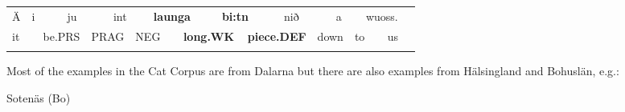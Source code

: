 \begin{tabular}{llllllllllllllllll}
\lsptoprule
Ä & \multicolumn{2}{l}{i

} & \multicolumn{2}{l}{ju

} & \multicolumn{2}{l}{int

} & \multicolumn{2}{l}{{\bfseries launga}

} & \multicolumn{2}{l}{{\bfseries bi:tn}

} & \multicolumn{2}{l}{nið

} & \multicolumn{2}{l}{a

} & \multicolumn{2}{l}{wuoss.

} & \\
\multicolumn{2}{l}{it

} & \multicolumn{2}{l}{be.PRS

} & \multicolumn{2}{l}{PRAG

} & \multicolumn{2}{l}{NEG

} & \multicolumn{2}{l}{{\bfseries long.WK}

} & \multicolumn{2}{l}{{\bfseries piece.DEF}

} & \multicolumn{2}{l}{down

} & \multicolumn{2}{l}{to

} & \multicolumn{2}{l}{us

}\\
\lspbottomrule
\end{tabular}

Most of the examples in the Cat Corpus are from Dalarna but there are also examples from Hälsingland and Bohuslän, e.g.:

\begin{listWWNumileveli}
\item 

\begin{styleExample}
Sotenäs (Bo)

\end{styleExample}

\end{listWWNumileveli}

